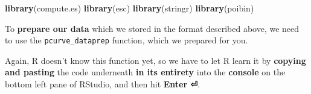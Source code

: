 \documentclass[]{book}
\newenvironment{Shaded}{\begin{snugshade}}{\end{snugshade}}
\newcommand{\KeywordTok}[1]{\textcolor[rgb]{0.13,0.29,0.53}{\textbf{#1}}}
\newcommand{\NormalTok}[1]{#1}
\theoremstyle{definition}
\theoremstyle{definition}
\theoremstyle{definition}
\theoremstyle{remark}
\begin{document}
\begin{Shaded}
\begin{Highlighting}[]
\KeywordTok{library}\NormalTok{(compute.es)}
\KeywordTok{library}\NormalTok{(esc)}
\KeywordTok{library}\NormalTok{(stringr)}
\KeywordTok{library}\NormalTok{(poibin)}
\end{Highlighting}
\end{Shaded}

To \textbf{prepare our data} which we stored in the format described
above, we need to use the \texttt{pcurve\_dataprep} function, which we
prepared for you.

Again, R doesn't know this function yet, so we have to let R learn it by
\textbf{copying and pasting} the code underneath \textbf{in its
entirety} into the \textbf{console} on the bottom left pane of RStudio,
and then hit \textbf{Enter ⏎}.
\end{document}
